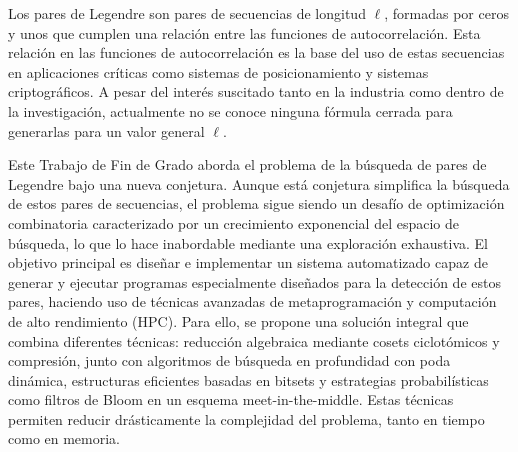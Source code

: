 Los pares de Legendre son pares de secuencias de longitud $\ell$, 
formadas por ceros y unos que cumplen una relación entre las funciones de
autocorrelación. Esta relación en las funciones de autocorrelación  es la base del uso de estas secuencias en aplicaciones críticas como sistemas de posicionamiento y sistemas criptográficos.
A pesar del interés suscitado tanto en la industria como dentro de la investigación, actualmente no se conoce ninguna fórmula cerrada para generarlas para un valor general $\ell$.

Este Trabajo de Fin de Grado aborda el problema de la búsqueda de pares de Legendre bajo una nueva conjetura.
Aunque está conjetura simplifica la búsqueda de estos pares de secuencias, el problema sigue siendo un desafío de optimización combinatoria caracterizado por un crecimiento exponencial del espacio de búsqueda, lo que lo hace inabordable mediante una exploración exhaustiva. El objetivo principal es diseñar e implementar un sistema automatizado capaz de generar y ejecutar programas especialmente diseñados para la detección de estos pares, haciendo uso de técnicas avanzadas de metaprogramación y computación de alto rendimiento (HPC).
Para ello, se propone una solución integral que combina diferentes técnicas:  reducción algebraica mediante cosets ciclotómicos y compresión, junto con algoritmos de búsqueda en profundidad con poda dinámica, estructuras eficientes basadas en bitsets y estrategias probabilísticas como filtros de Bloom en un esquema meet-in-the-middle. Estas técnicas permiten reducir drásticamente la complejidad del problema, tanto en tiempo como en memoria.

